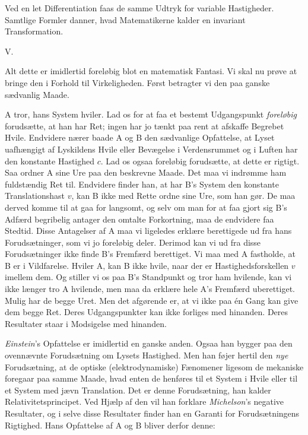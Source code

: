\documentclass[12pt,a4paper]{article}
\newcommand{\opage}[1]{\marginnote{\footnotesize\textit{[#1]}}}
\begin{document}
Ved en let Differentiation faas de samme Udtryk for variable Hastigheder.
Samtlige Formler danner, hvad Matematikerne kalder \guillemotright en
invariant Transformation\guillemotleft.

\begin{center}
V.
\end{center}

Alt dette er imidlertid foreløbig blot en matematisk Fantasi. Vi skal nu
prøve at bringe den i Forhold til Virkeligheden. Først betragter vi den
paa ganske sædvanlig Maade.

A tror, hans System hviler. Lad os for at faa et bestemt Udgangspunkt
\emph{foreløbig} forudsætte, at han har Ret; ingen har jo tænkt paa rent
at afskaffe Begrebet Hvile. Endvidere nærer
\opage{14} baade A og B den sædvanlige Opfattelse, at Lyset uafhængigt af Lyskildens
Hvile eller Bevægelse i Verdensrummet og i Luften har den konstante
Hastighed $c$. Lad os ogsaa foreløbig forudsætte, at dette er rigtigt. Saa
ordner A sine Ure paa den beskrevne Maade. Det maa vi indrømme ham
fuldstændig Ret til. Endvidere finder han, at har B's System den konstante
Translationshast $v$, kan B ikke med Rette ordne sine Ure, som han gør. De
maa derved komme til at gaa for langsomt, og selv om man for at faa gjort
sig B's Adfærd begribelig antager den omtalte Forkortning, maa de endvidere
faa Stedtid. Disse Antagelser af A maa vi ligeledes erklære berettigede ud
fra hans Forudsætninger, som vi jo foreløbig deler. Derimod kan vi ud fra
disse Forudsætninger ikke finde B's Fremfærd berettiget. Vi maa med A
fastholde, at B er i Vildfarelse. Hviler A, kan B ikke hvile, naar der er
Hastighedsforskellen $v$ imellem dem. Og stiller vi os paa B's Standpunkt
og tror ham hvilende, kan vi ikke længer tro A hvilende, men maa da erklære
hele A's Fremfærd uberettiget. Mulig har de begge Uret. Men det afgørende
er, at vi ikke paa én Gang kan give dem begge Ret. Deres Udgangspunkter kan
ikke forliges med hinanden. Deres Resultater staar i Modsigelse med
hinanden.

\emph{Einstein}'s Opfattelse er imidlertid en ganske anden. Ogsaa han
bygger paa den ovennævnte Forudsætning om Lysets Hastighed. Men han føjer
hertil den \emph{nye} Forudsætning, at de optiske (elektrodynamiske)
Fænomener \guillemotright ligesom de mekaniske\guillemotleft{} foregaar paa
samme Maade, hvad enten de henføres til et System i Hvile eller til et
System med jævn Translation. Det er denne Forudsætning, han kalder
\guillemotright Relativitetsprincipet\guillemotleft. Ved Hjælp af den vil
han forklare \emph{Michelson}'s negative Resultater, og i selve disse
Resultater finder han en Garanti for Forudsætningens Rigtighed. Hans
Opfattelse af A og B bliver derfor denne:
\end{document}
